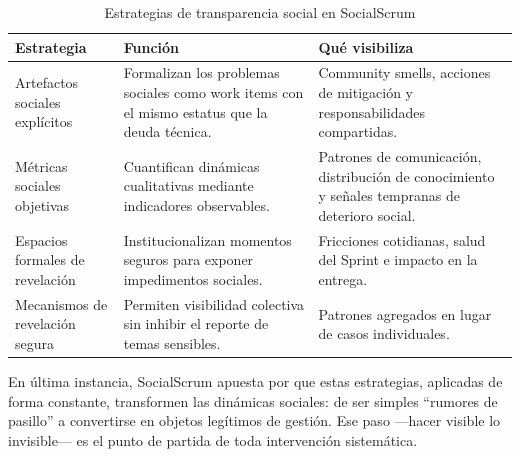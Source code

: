 \begin{table}[htb]
    \caption{Estrategias de transparencia social en SocialScrum}
    \label{tab:transparencia_mecanismos}
    \centering
    \small
    \begin{tabular}{@{}p{3.5cm}p{5.5cm}p{4.5cm}@{}}
        \toprule
        \textbf{Estrategia}                                                                          & \textbf{Función} & \textbf{Qué visibiliza} \\
        \midrule
        Artefactos sociales explícitos                                                               &
        Formalizan los problemas sociales como work items con el mismo estatus que la deuda técnica. &
        Community smells, acciones de mitigación y responsabilidades compartidas.                                                                 \\
        \addlinespace
        Métricas sociales objetivas                                                                  &
        Cuantifican dinámicas cualitativas mediante indicadores observables.                         &
        Patrones de comunicación, distribución de conocimiento y señales tempranas de deterioro social.                                           \\
        \addlinespace

        Espacios formales de revelación                                                              &
        Institucionalizan momentos seguros para exponer impedimentos sociales.                       &
        Fricciones cotidianas, salud del Sprint e impacto en la entrega.                                                                          \\
        \addlinespace

        Mecanismos de revelación segura                                                              &
        Permiten visibilidad colectiva sin inhibir el reporte de temas sensibles.                    &
        Patrones agregados en lugar de casos individuales.                                                                                        \\
        \bottomrule
    \end{tabular}
\end{table}

En última instancia, SocialScrum apuesta por que estas estrategias, aplicadas de forma constante, transformen las dinámicas sociales: de ser simples ``rumores de pasillo'' a convertirse en objetos legítimos de gestión.
Ese paso —hacer visible lo invisible— es el punto de partida de toda intervención sistemática.

